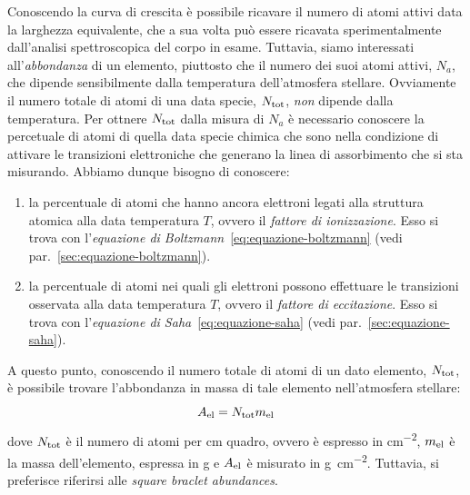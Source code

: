 Conoscendo la curva di crescita è possibile ricavare il numero di atomi attivi data la larghezza equivalente, che a sua volta può essere ricavata sperimentalmente dall'analisi spettroscopica del corpo in esame. Tuttavia, siamo interessati all'\emph{abbondanza} di un elemento, piuttosto che il numero dei suoi atomi attivi, $N_a$, che dipende sensibilmente dalla temperatura dell'atmosfera stellare. Ovviamente il numero totale di atomi di una data specie, $N_\textup{tot}$, \emph{non} dipende dalla temperatura. Per ottnere $N_\textup{tot}$ dalla misura di $N_a$ è necessario conoscere la percetuale di atomi di quella data specie chimica che sono nella condizione di attivare le transizioni elettroniche che generano la linea di assorbimento che si sta misurando. Abbiamo dunque bisogno di conoscere:
\begin{enumerate}
    \item la percentuale di atomi che hanno ancora elettroni legati alla struttura atomica alla data temperatura $T$, ovvero il \emph{fattore di ionizzazione}. Esso si trova con l'\emph{equazione di Boltzmann}~\eqref{eq:equazione-boltzmann} (vedi par.~\ref{sec:equazione-boltzmann}).
    \item la percentuale di atomi nei quali gli elettroni possono effettuare le transizioni osservata alla data temperatura $T$, ovvero il \emph{fattore di eccitazione}. Esso si trova con l'\emph{equazione di Saha}~\eqref{eq:equazione-saha} (vedi par.~\ref{sec:equazione-saha}).
\end{enumerate} 

A questo punto, conoscendo il numero totale di atomi di un dato elemento, $N_\textup{tot}$, è possibile trovare l'abbondanza in massa di tale elemento nell'atmosfera stellare:
\begin{equation}\label{eq:abbondanza-in-massa}
    A_\textup{el} = N_\textup{tot} m_\textup{el}
\end{equation}
dove $N_\textup{tot}$ è il numero di atomi per \si{cm} quadro, ovvero è espresso in \si{cm^{-2}}, $m_\textup{el}$ è la massa dell'elemento, espressa in \si{g} e $A_\textup{el}$ è misurato in \si{g.cm^{-2}}. Tuttavia, si preferisce riferirsi alle \emph{square braclet abundances}.

